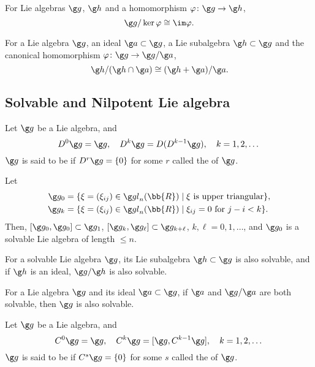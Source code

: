 For Lie algebras $\g g$, $\g h$ and a homomorphism $\varphi \colon \g g \to \g h$,
\[
\g g / \ker \varphi \cong \im \varphi.
\]

For a Lie algebra $\g g$, an ideal $\g a \subset \g g$, a Lie subalgebra $\g h \subset \g g$ and the canonical homomorphism $\varphi \colon \g g \to \g g / \g a$,
\[
\g h / (\g h \cap \g a) \cong (\g h + \g a)/\g a.
\]

\subsection{Solvable and Nilpotent Lie algebra}
Let $\g g$ be a Lie algebra, and
\[
D^0\g g = \g g,\quad D^k \g g = D(D^{k-1}\g g),\quad k = 1, 2, \dotsc
\]
$\g g$ is said to be  if $D^r\g g = \{ 0 \}$ for some $r$ called the  of $\g g$.

Let
\begin{align*}
\g g_0 &= \{ \xi = (\xi_{ij}) \in \gl_n(\bb{R}) \mid \xi\ \text{is upper triangular} \}, \\
\g g_k &= \{ \xi = (\xi_{ij}) \in \gl_n(\bb{R}) \mid \xi_{ij} = 0 \ \text{for}\ j - i < k \}.
\end{align*}
Then, $[\g g_0, \g g_0] \subset \g g_1$, $[\g g_k, \g g_\ell] \subset \g g_{k+\ell}$, $k, \ell = 0, 1, \dotsc$, and $\g g_0$ is a solvable Lie algebra of length $\le n$.

For a solvable Lie algebra $\g g$, its Lie subalgebra $\g h \subset \g g$ is also solvable, and if $\g h$ is an ideal, $\g g / \g h$ is also solvable.

For a Lie algebra $\g g$ and its ideal $\g a \subset \g g$, if $\g a$ and $\g g / \g a$ are both solvable, then $\g g$ is also solvable.

Let $\g g$ be a Lie algebra, and
\[
C^0 \g g = \g g,\quad C^k \g g = [\g g, C^{k-1}\g g],\quad k = 1, 2, \dotsc
\]
$\g g$ is said to be  if $C^s \g g = \{ 0 \}$ for some $s$ called the  of $\g g$.

